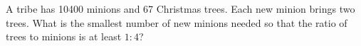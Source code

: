 A tribe has 10400 minions and 67 Christmas trees. Each new minion brings two trees. What is the smallest number of new minions needed so that the ratio of trees to minions is at least $1:4$?
